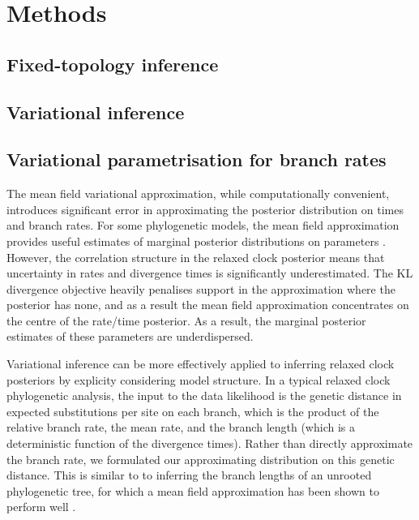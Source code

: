 \documentclass{article}
\begin{document}
\section*{Methods}

\subsection*{Fixed-topology inference}


\subsection*{Variational inference}


\subsection*{Variational parametrisation for branch rates}

The mean field variational approximation, while computationally convenient, introduces significant error in approximating the posterior distribution on times and branch rates. For some phylogenetic models, the mean field approximation provides useful estimates of marginal posterior distributions on parameters \cite{fourment2019evaluating}. However, the correlation structure in the relaxed clock posterior means that uncertainty in rates and divergence times is significantly underestimated. The KL divergence objective heavily penalises support in the approximation where the posterior has none, and as a result the mean field approximation concentrates on the centre of the rate/time posterior. As a result, the marginal posterior estimates of these parameters are underdispersed.

Variational inference can be more effectively applied to inferring relaxed clock posteriors by explicity considering model structure. In a typical relaxed clock phylogenetic analysis, the input to the data likelihood is the genetic distance in expected substitutions per site on each branch, which is the product of the relative branch rate, the mean rate, and the branch length (which is a deterministic function of the divergence times). Rather than directly approximate the branch rate, we formulated our approximating distribution on this genetic distance. This is similar to to inferring the branch lengths of an unrooted phylogenetic tree, for which a mean field approximation has been shown to perform well \cite{zhang2018variational}.
\end{document}
